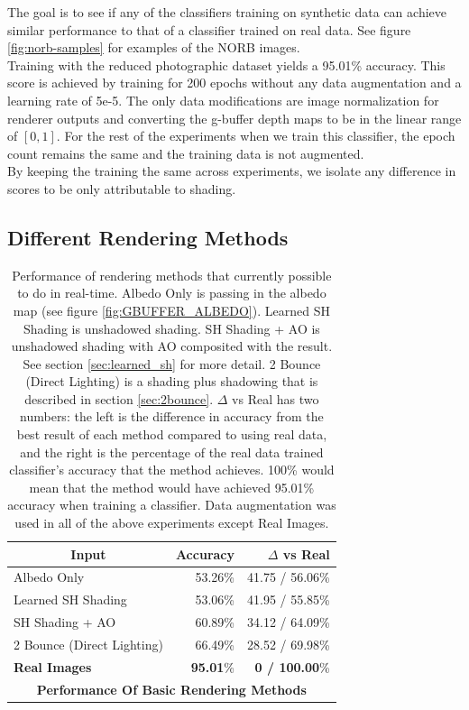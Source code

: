 \documentclass[10pt,twocolumn,letterpaper]{article}
\begin{document}
 The goal is to see if any of the classifiers training on synthetic data can achieve similar performance to that of a classifier trained on real data.  See figure \ref{fig:norb-samples} for examples of the NORB images.\\

Training with the reduced photographic dataset yields a 95.01\% accuracy.  This score is achieved by training for 200 epochs without any data augmentation and a learning rate of 5e-5. The only data modifications are image normalization for renderer outputs and converting the g-buffer depth maps to be in the linear range of $[0,1]$.  For the rest of the experiments when we train this classifier, the epoch count remains the same and the training data is not augmented.\\  

By keeping the training the same across experiments, we isolate any difference in scores to be only attributable to shading.
\subsection{Different Rendering Methods}
\begin{table}[]
\centering
\label{tblnonGI}
\begin{tabular}{|l|r|r|}
\hline
\multicolumn{1}{|c|}{\textbf{Input}}
& \multicolumn{1}{r|}{\textbf{Accuracy}}
& \multicolumn{1}{r|}{\textbf{$\Delta$ vs Real}} \\ \hline
Albedo Only 				&53.26\%	& 41.75 / 56.06\%	\\
Learned SH Shading			&53.06\%	& 41.95 / 55.85\%	\\
SH Shading + AO				&60.89\%    & 34.12 / 64.09\%   \\
2 Bounce (Direct Lighting)	&66.49\%	& 28.52 / 69.98\%   \\
\textbf{Real Images}		& \textbf{95.01}\%	& \textbf{0 / 100.00}\%	\\ \hline
\multicolumn{3}{|c|}{\textbf{Performance Of Basic Rendering Methods}}	\\ \hline
\end{tabular}

\caption{Performance of rendering methods that currently possible to do in real-time. Albedo Only is passing in the albedo map (see figure \ref{fig:GBUFFER_ALBEDO}). Learned SH Shading is unshadowed shading. SH Shading + AO is unshadowed shading with AO composited with the result. See section \ref{sec:learned_sh} for more detail. 2 Bounce (Direct Lighting) is a shading plus shadowing that is described in section \ref{sec:2bounce}. $\Delta$ vs Real has two numbers: the left is the difference in accuracy from the best result of each method compared to using real data, and the right is the percentage of the real data trained classifier's accuracy that the method achieves.  100\% would mean that the method would have achieved 95.01\% accuracy when training a classifier. Data augmentation was used in all of the above experiments except Real Images.} 
\end{table}
\end{document}
